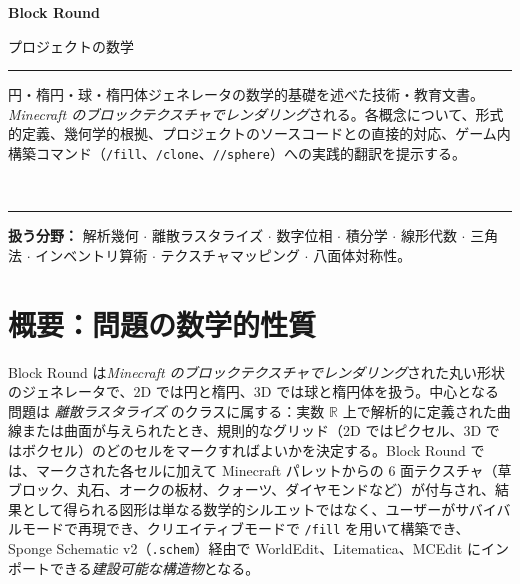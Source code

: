\documentclass[12pt,a4paper]{scrartcl}
\newcommand{\code}[1]{\texttt{\small #1}}
\newcommand{\cmd}[1]{\textcolor{earth}{\texttt{\small #1}}}
\begin{document}
\begin{titlepage}
  \centering
  \vspace*{3.5cm}
  {\sffamily\bfseries\fontsize{56}{60}\selectfont \color{accent} Block Round\par}
  \vspace{0.7cm}
  {\sffamily\LARGE\color{muted} プロジェクトの数学\par}
  \vspace{1.4cm}
  {\color{rule}\rule{0.6\textwidth}{0.6pt}\par}
  \vspace{0.9cm}
  \begin{minipage}{0.82\textwidth}
    \centering\color{ink}\large
    円・楕円・球・楕円体ジェネレータの数学的基礎を述べた技術・教育文書。\emph{Minecraft のブロックテクスチャでレンダリング}される。各概念について、形式的定義、幾何学的根拠、プロジェクトのソースコードとの直接的対応、ゲーム内構築コマンド（\cmd{/fill}、\cmd{/clone}、\cmd{//sphere}）への実践的翻訳を提示する。
  \end{minipage}
  \vspace{0.9cm}\\
  {\color{rule}\rule{0.6\textwidth}{0.6pt}\par}
  \vspace{2cm}
  \begin{minipage}{0.78\textwidth}
    \centering\sffamily\small\color{muted}
    \textbf{扱う分野：} 解析幾何 $\cdot$ 離散ラスタライズ $\cdot$ 数字位相 $\cdot$ 積分学 $\cdot$ 線形代数 $\cdot$ 三角法 $\cdot$ インベントリ算術 $\cdot$ テクスチャマッピング $\cdot$ 八面体対称性。
  \end{minipage}
\end{titlepage}

\renewcommand{\contentsname}{\color{accent}目次}
\tableofcontents
\thispagestyle{fancy}
\newpage

\section{概要：問題の数学的性質}

Block Round は\emph{Minecraft のブロックテクスチャでレンダリング}された丸い形状のジェネレータで、2D では円と楕円、3D では球と楕円体を扱う。中心となる問題は \emph{離散ラスタライズ} のクラスに属する：実数 $\mathbb{R}$ 上で解析的に定義された曲線または曲面が与えられたとき、規則的なグリッド（2D ではピクセル、3D ではボクセル）のどのセルをマークすればよいかを決定する。Block Round では、マークされた各セルに加えて Minecraft パレットからの 6 面テクスチャ（草ブロック、丸石、オークの板材、クォーツ、ダイヤモンドなど）が付与され、結果として得られる図形は単なる数学的シルエットではなく、ユーザーがサバイバルモードで再現でき、クリエイティブモードで \cmd{/fill} を用いて構築でき、Sponge Schematic v2（\code{.schem}）経由で WorldEdit、Litematica、MCEdit にインポートできる\emph{建設可能な構造物}となる。
\end{document}
